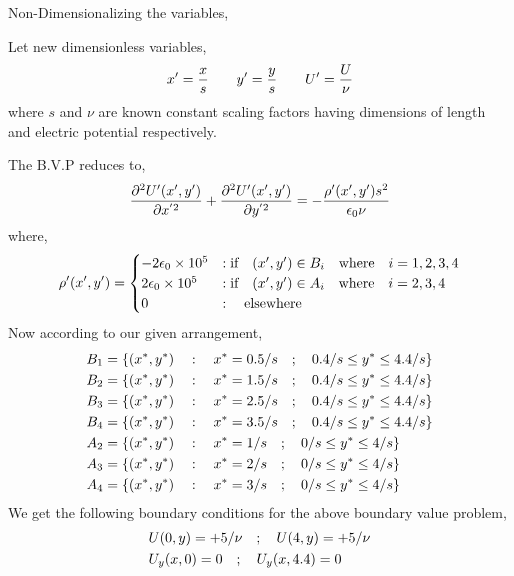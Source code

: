 Non-Dimensionalizing the variables, \autocite{tudortmundkuzmin2}

Let new dimensionless variables,
\begin{align}
    x' = \frac{x}{s} \gs \gs y' = \frac{y}{s} \gs \gs U' = \frac{U}{\nu}
\end{align}
where $s$ and $\nu$ are known constant scaling factors having dimensions of length and electric potential respectively.

The B.V.P reduces to,
\begin{equation}
    \frac{\partial^2U'(x',y') }{\partial x^{'2}} + \frac{\partial^2U'(x',y') }{\partial y^{'2}}= -\frac{\rho'(x',y') s^2}{\epsilon_0 \nu} \\
\end{equation}
where,
\begin{equation}
\rho'(x',y') =  \begin{cases}
    -2\epsilon_0 \times 10^5  & :\text{if} \hspace{0.35cm} (x',y') \in B_i \hspace{0.35cm} \text{where} \hspace{0.35cm} i = 1,2,3,4 \\
    2\epsilon_0 \times 10^5 & :\text{if} \hspace{0.35cm} (x',y') \in A_i \hspace{0.35cm} \text{where} \hspace{0.35cm} i = 2,3,4 \\
    0  & : \hspace{0.35cm} \text{elsewhere}
\end{cases}
\end{equation}
Now according to our given arrangement,
\begin{align}
    B_1 &= \{ (x^*,y^*) \hspace{0.35cm} : \hspace{0.35cm} x^*= 0.5/s \hspace{0.35cm};\hspace{0.35cm} 0.4/s \leq y^* \leq 4.4/s \} \\
    B_2 &= \{ (x^*,y^*) \hspace{0.35cm} : \hspace{0.35cm} x^*= 1.5/s \hspace{0.35cm};\hspace{0.35cm} 0.4/s \leq y^* \leq 4.4/s \} \\
    B_3 &= \{ (x^*,y^*) \hspace{0.35cm} : \hspace{0.35cm} x^*= 2.5/s \hspace{0.35cm};\hspace{0.35cm} 0.4/s \leq y^* \leq 4.4/s \} \\
    B_4 &= \{ (x^*,y^*) \hspace{0.35cm} : \hspace{0.35cm} x^*= 3.5/s \hspace{0.35cm};\hspace{0.35cm} 0.4/s \leq y^* \leq 4.4/s \} \\
    A_2 &= \{ (x^*,y^*) \hspace{0.35cm} : \hspace{0.35cm} x^*= 1/s \hspace{0.35cm};\hspace{0.35cm} 0/s \leq y^* \leq 4/s \} \\
    A_3 &= \{ (x^*,y^*) \hspace{0.35cm} : \hspace{0.35cm} x^*= 2/s \hspace{0.35cm};\hspace{0.35cm} 0/s \leq y^* \leq 4/s \} \\
    A_4 &= \{ (x^*,y^*) \hspace{0.35cm} : \hspace{0.35cm} x^*= 3/s \hspace{0.35cm};\hspace{0.35cm} 0/s \leq y^* \leq 4/s \} 
\end{align}
We get the following boundary conditions for the above boundary value problem,
\begin{align}
    & U(0,y) = +5/\nu \hspace{0.35cm}; \hspace{0.35cm} U(4,y) = +5/\nu \\ 
    & U_y(x,0) = 0 \hspace{0.35cm}; \hspace{0.35cm} U_y(x,4.4) = 0 
\end{align}

